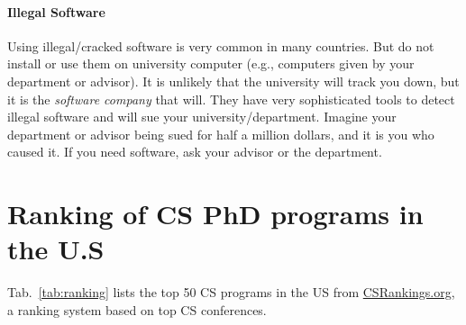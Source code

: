 \documentclass[11pt]{article}
\begin{document}
\paragraph{Illegal Software} Using illegal/cracked software is very common in many countries. But do not install or use them on university computer (e.g., computers given by your department or advisor).  It is unlikely that the university will track you down, but it is the \emph{software company} that will.  They have very sophisticated tools to detect illegal software and will sue your university/department.  Imagine your department or advisor being sued for half a million dollars, and it is you who caused it.   If you need software, ask your advisor or the department.


\section{Ranking of CS PhD programs in the U.S}\label{sec:ranking}
  Tab.~\ref{tab:ranking} lists the top 50 CS programs in the US from \href{https://www.csrankings.org}{CSRankings.org}, a ranking system  based on top CS conferences.
  
\end{document}
